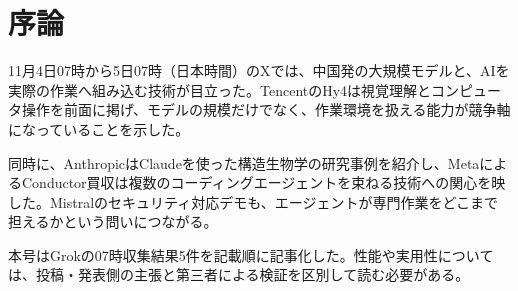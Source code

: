 \section{序論}
11月4日07時から5日07時（日本時間）のXでは、中国発の大規模モデルと、AIを実際の作業へ組み込む技術が目立った。TencentのHy4は視覚理解とコンピュータ操作を前面に掲げ、モデルの規模だけでなく、作業環境を扱える能力が競争軸になっていることを示した。

同時に、AnthropicはClaudeを使った構造生物学の研究事例を紹介し、MetaによるConductor買収は複数のコーディングエージェントを束ねる技術への関心を映した。Mistralのセキュリティ対応デモも、エージェントが専門作業をどこまで担えるかという問いにつながる。

本号はGrokの07時収集結果5件を記載順に記事化した。性能や実用性については、投稿・発表側の主張と第三者による検証を区別して読む必要がある。
